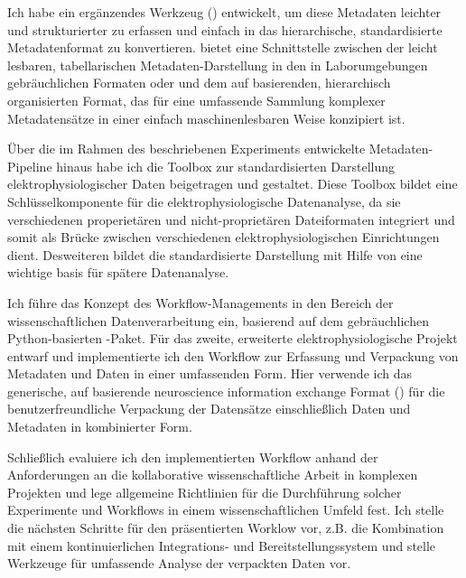 Ich habe ein ergänzendes Werkzeug () entwickelt, um diese Metadaten leichter und strukturierter zu erfassen und einfach in das hierarchische, standardisierte Metadatenformat  zu konvertieren.  bietet eine Schnittstelle zwischen der leicht lesbaren, tabellarischen Metadaten-Darstellung in den in Laborumgebungen gebräuchlichen Formaten  oder  und dem auf  basierenden, hierarchisch organisierten  Format, das für eine umfassende Sammlung komplexer Metadatensätze in einer einfach maschinenlesbaren Weise konzipiert ist.

Über die im Rahmen des beschriebenen Experiments entwickelte Metadaten-Pipeline hinaus habe ich die  Toolbox zur standardisierten Darstellung elektrophysiologischer Daten beigetragen und gestaltet. Diese Toolbox bildet eine Schlüsselkomponente für die elektrophysiologische Datenanalyse, da sie  verschiedenen properietären und nicht-proprietären Dateiformaten integriert und somit als Brücke zwischen verschiedenen elektrophysiologischen Einrichtungen dient. Desweiteren bildet die standardisierte Darstellung mit Hilfe von  eine wichtige basis für spätere Datenanalyse.

Ich führe das Konzept des Workflow-Managements in den Bereich der wissenschaftlichen Datenverarbeitung ein, basierend auf dem gebräuchlichen Python-basierten -Paket. Für das zweite, erweiterte elektrophysiologische Projekt entwarf und implementierte ich den Workflow zur Erfassung und Verpackung von Metadaten und Daten in einer umfassenden Form. Hier verwende ich das generische, auf  basierende neuroscience information exchange Format () für die benutzerfreundliche Verpackung der Datensätze einschließlich Daten und Metadaten in kombinierter Form.

Schließlich evaluiere ich den implementierten Workflow anhand der Anforderungen an die kollaborative wissenschaftliche Arbeit in komplexen Projekten und lege allgemeine Richtlinien für die Durchführung solcher Experimente und Workflows in einem wissenschaftlichen Umfeld fest. Ich stelle die nächsten Schritte für den präsentierten Worklow vor, z.B. die Kombination mit einem kontinuierlichen Integrations- und Bereitstellungssystem und stelle Werkzeuge für umfassende Analyse der verpackten Daten vor.



\vspace{2.5cm}
